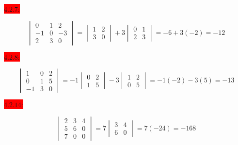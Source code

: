 \documentclass{exam}
\begin{document}
  \newpage

  \colorbox{red}{\underline{$4.2.7$}:}
  \begin{solution}
    \[
      \begin{vmatrix}
        0 & 1 & 2 \\
        -1 & 0 & -3 \\
        2 & 3 & 0 
      \end{vmatrix}
      = \begin{vmatrix}
        1 & 2 \\
        3 & 0 
      \end{vmatrix}
      + 3\begin{vmatrix}
        0 & 1 \\
        2 & 3
      \end{vmatrix}
      = -6 + 3(-2) = \boxed{-12}
    \]
  \end{solution}

  \colorbox{red}{\underline{$4.2.8$}:}
  \begin{solution}
    \[
      \begin{vmatrix}
        1 & 0 & 2 \\
        0 & 1 & 5 \\
        -1 & 3 & 0 
      \end{vmatrix}
      = -1\begin{vmatrix}
        0 & 2 \\
        1 & 5
      \end{vmatrix}
      -3 \begin{vmatrix}
        1 & 2 \\
        0 & 5
      \end{vmatrix}
      = -1(-2) - 3(5) = \boxed{-13}
    \]
  \end{solution}

  \colorbox{red}{\underline{$4.2.14$}:}
  \begin{solution}
    \[
      \begin{vmatrix}
        2 & 3 & 4 \\
        5 & 6 & 0 \\
        7 & 0 & 0
      \end{vmatrix}
      = 7\begin{vmatrix}
        3 & 4 \\
        6 & 0 
      \end{vmatrix}
      = 7(-24) = \boxed{-168}
    \]
  \end{solution}
\end{document}
